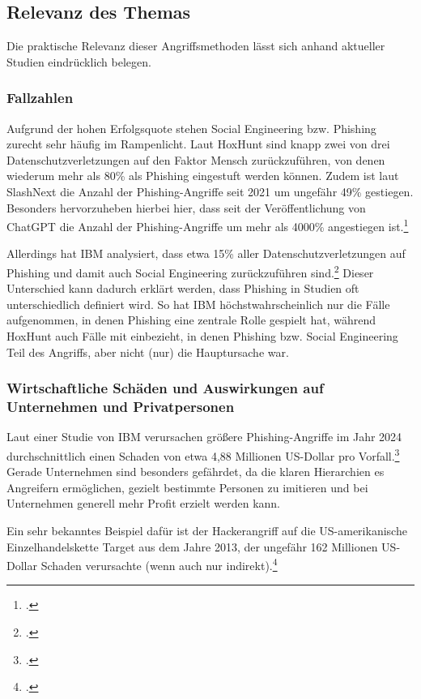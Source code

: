 \documentclass[12pt, a4paper, oneside]{scrartcl}
\begin{document}
\subsection{Relevanz des Themas}
Die praktische Relevanz dieser Angriffsmethoden lässt sich anhand aktueller Studien eindrücklich belegen.
\subsubsection{Fallzahlen}
Aufgrund der hohen Erfolgsquote stehen Social Engineering bzw. Phishing zurecht sehr häufig im Rampenlicht. 
Laut HoxHunt sind knapp zwei von drei 
Datenschutzverletzungen auf den Faktor Mensch zurückzuführen, von denen wiederum mehr als 80\%
als Phishing eingestuft werden können. Zudem ist laut SlashNext die Anzahl der Phishing-Angriffe
seit 2021 um ungefähr 49\% gestiegen. Besonders hervorzuheben hierbei hier, dass seit der Veröffentlichung
von ChatGPT die Anzahl der Phishing-Angriffe um mehr als 4000\% angestiegen ist.\footcite{HoxHunt_Report}
\par
Allerdings hat IBM analysiert, dass etwa 15\% aller Datenschutzverletzungen auf Phishing und
damit auch Social Engineering zurückzuführen sind.\footcite{IBM_Report}
Dieser Unterschied kann dadurch erklärt werden, dass Phishing in Studien oft unterschiedlich
definiert wird. So hat IBM höchstwahrscheinlich nur die Fälle aufgenommen, in denen 
Phishing eine zentrale Rolle gespielt hat, während HoxHunt auch Fälle mit einbezieht,
in denen Phishing bzw. Social Engineering Teil des Angriffs, aber nicht (nur) die Hauptursache war.

\subsubsection{Wirtschaftliche Schäden und Auswirkungen auf Unternehmen und Privatpersonen}
Laut einer Studie von IBM verursachen größere Phishing-Angriffe im Jahr 2024 durchschnittlich 
einen Schaden von etwa 4,88 Millionen US-Dollar pro Vorfall.\footcite{IBM_Phishing}
Gerade Unternehmen sind besonders gefährdet, da die klaren Hierarchien es Angreifern ermöglichen, 
gezielt bestimmte Personen zu imitieren und bei Unternehmen generell mehr Profit erzielt werden kann.
\par
Ein sehr bekanntes Beispiel dafür ist der Hackerangriff auf die US-amerikanische Einzelhandelskette Target 
aus dem Jahre 2013, der ungefähr 162 Millionen US-Dollar Schaden verursachte (wenn auch nur indirekt).\footcite{Target_Breach}\\
\end{document}
